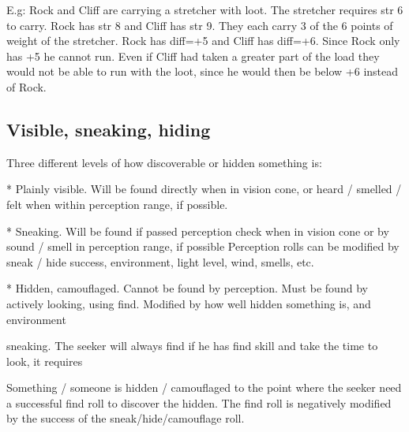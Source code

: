 E.g: Rock and Cliff are carrying a stretcher with loot. The stretcher requires str 6 to carry. Rock has str 8 and Cliff has str 9. They each carry 3 of the 6 points of weight of the stretcher. Rock has diff=+5 and Cliff has diff=+6. Since Rock only has +5 he cannot run. Even if Cliff had taken a greater part of the load they would not be able to run with the loot, since he would then be below +6 instead of Rock.




















\subsection*{Visible, sneaking, hiding}
\todo Three different levels of how discoverable or hidden something is:


 *   Plainly visible. Will be found directly when in vision cone, or heard / smelled / felt when within perception range, if possible.


 *   Sneaking. Will be found if passed perception check when in vision cone or by sound / smell in perception range, if possible
Perception rolls can be modified by sneak / hide success, environment, light level, wind, smells, etc.


 *   Hidden, camouflaged. Cannot be found by perception. Must be found by actively looking, using find.
Modified by how well hidden something is, and environment



sneaking. The seeker will always find if he has find skill and take the time to look, it requires

Something / someone is hidden / camouflaged to the point where the seeker need a successful find roll to discover the hidden. The find roll is negatively modified by the success of the sneak/hide/camouflage roll.



